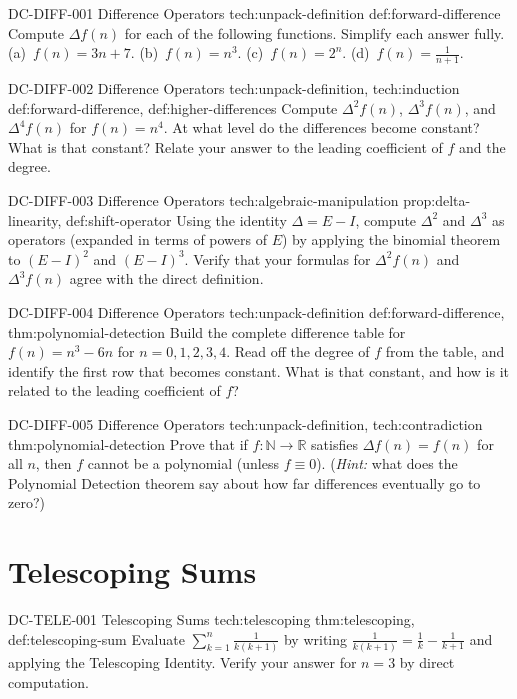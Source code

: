 \exstubgenfull
  {DC-DIFF-001}
  {Difference Operators}
  {tech:unpack-definition}
  {def:forward-difference}
  {Compute \(\Delta f(n)\) for each of the following functions.
  Simplify each answer fully.
  (a)~\(f(n) = 3n + 7\).
  (b)~\(f(n) = n^3\).
  (c)~\(f(n) = 2^n\).
  (d)~\(f(n) = \frac{1}{n+1}\).}

\exstubgenfull
  {DC-DIFF-002}
  {Difference Operators}
  {tech:unpack-definition, tech:induction}
  {def:forward-difference, def:higher-differences}
  {Compute \(\Delta^2 f(n)\), \(\Delta^3 f(n)\), and \(\Delta^4 f(n)\) for
  \(f(n) = n^4\). At what level do the differences become constant?
  What is that constant? Relate your answer to the leading coefficient
  of \(f\) and the degree.}

\exstubgenfull
  {DC-DIFF-003}
  {Difference Operators}
  {tech:algebraic-manipulation}
  {prop:delta-linearity, def:shift-operator}
  {Using the identity \(\Delta = E - I\), compute \(\Delta^2\) and \(\Delta^3\)
  as operators (expanded in terms of powers of \(E\)) by applying the binomial
  theorem to \((E-I)^2\) and \((E-I)^3\). Verify that your formulas for
  \(\Delta^2 f(n)\) and \(\Delta^3 f(n)\) agree with the direct definition.}

\exstubgenfull
  {DC-DIFF-004}
  {Difference Operators}
  {tech:unpack-definition}
  {def:forward-difference, thm:polynomial-detection}
  {Build the complete difference table for \(f(n) = n^3 - 6n\) for
  \(n = 0, 1, 2, 3, 4\). Read off the degree of \(f\) from the table,
  and identify the first row that becomes constant. What is that constant,
  and how is it related to the leading coefficient of \(f\)?}

\exstubgenfull
  {DC-DIFF-005}
  {Difference Operators}
  {tech:unpack-definition, tech:contradiction}
  {thm:polynomial-detection}
  {Prove that if \(f : \mathbb{N} \to \mathbb{R}\) satisfies
  \(\Delta f(n) = f(n)\) for all \(n\), then \(f\) cannot be a
  polynomial (unless \(f \equiv 0\)). (\emph{Hint:} what does the
  Polynomial Detection theorem say about how far differences eventually
  go to zero?)}

\section*{Telescoping Sums}

\exstubgenfull
  {DC-TELE-001}
  {Telescoping Sums}
  {tech:telescoping}
  {thm:telescoping, def:telescoping-sum}
  {Evaluate \(\displaystyle\sum_{k=1}^{n}\frac{1}{k(k+1)}\) by writing
  \(\frac{1}{k(k+1)} = \frac{1}{k} - \frac{1}{k+1}\) and applying the
  Telescoping Identity. Verify your answer for \(n = 3\) by direct
  computation.}

